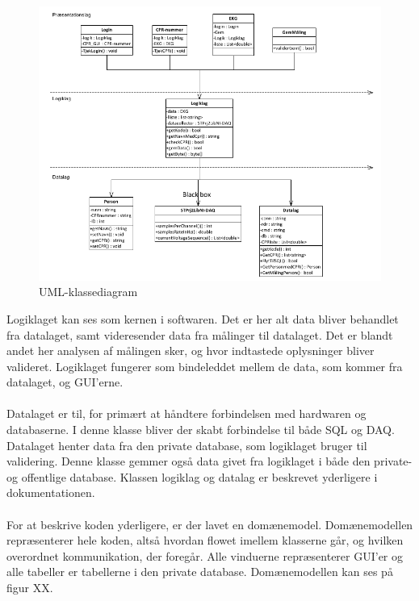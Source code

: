 \begin{figure}[H]
	\centering
	\includegraphics[width=1\textwidth]{Figurer/Snip20150512_9}
	\caption{UML-klassediagram}
\end{figure}
 
Logiklaget kan ses som kernen i softwaren. Det er her alt data bliver behandlet fra datalaget, samt videresender data fra målinger til datalaget. Det er blandt andet her analysen af målingen sker, og hvor indtastede oplysninger bliver valideret. Logiklaget fungerer som bindeleddet mellem de data, som kommer fra datalaget, og GUI’erne. \\ \\
Datalaget er til, for primært at håndtere forbindelsen med hardwaren og databaserne. I denne klasse bliver der skabt forbindelse til både SQL og DAQ. Datalaget henter data fra den private database, som logiklaget bruger til validering. Denne klasse gemmer også data givet fra logiklaget i både den private- og offentlige database. Klassen logiklag og datalag er beskrevet yderligere i dokumentationen. \\ \\
For at beskrive koden yderligere, er der lavet en domænemodel. Domænemodellen repræsenterer hele koden, altså hvordan flowet imellem klasserne går, og hvilken overordnet kommunikation, der foregår. Alle vinduerne repræsenterer GUI’er og alle tabeller er tabellerne i den private database. Domænemodellen kan ses på figur XX. 

